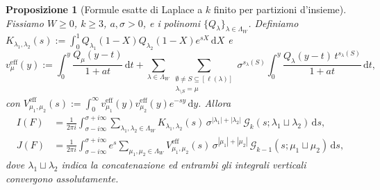 \documentclass[11pt, reqno]{amsart}
\newtheorem{proposition}[lemma]{Proposizione}
\theoremstyle{remark}
\numberwithin{equation}{section}
\newcommand{\cG}{\mathcal{G}}
\newcommand{\dd}{\,\mathrm{d}}
\begin{document}
\begin{proposition}[Formule esatte di Laplace a $k$ finito per partizioni d'insieme]\label{prop:exact-laplace}
Fissiamo $W \ge 0$, $k \ge 3$, $a, \sigma > 0$, e i polinomi $\{Q_\lambda\}_{\lambda \in \Lambda_W}$.
Definiamo $K_{\lambda_1,\lambda_2}(s) := \int_0^1 Q_{\lambda_1}(1-X) Q_{\lambda_2}(1-X) e^{sX}\dd X$ e
\begin{equation}\label{eq:v-eff-def}
v_\mu^{\mathrm{eff}}(y) := \int_0^y \frac{Q_\mu(y-t)}{1+at}\dd t
+ \sum_{\lambda \in \Lambda_W}\sum_{\substack{\emptyset \neq S \subseteq [\ell(\lambda)] \\ \lambda_{\setminus S} = \mu}}
\sigma^{s_\lambda(S)} \int_0^y \frac{Q_\lambda(y-t)\, t^{s_\lambda(S)}}{1+at}\dd t,
\end{equation}
con $V_{\mu_1,\mu_2}^{\mathrm{eff}}(s) := \int_0^\infty v_{\mu_1}^{\mathrm{eff}}(y) v_{\mu_2}^{\mathrm{eff}}(y) e^{-sy}\dd y$.
Allora
\begin{align}
I(F) &= \frac{1}{2\pi i}\int_{\sigma-i\infty}^{\sigma+i\infty}
\sum_{\lambda_1,\lambda_2 \in \Lambda_W} K_{\lambda_1,\lambda_2}(s)\,
\sigma^{|\lambda_1|+|\lambda_2|} \, \cG_k(s; \lambda_1 \sqcup \lambda_2)\dd s,
\label{eq:I-exact-laplace}\\
J(F) &= \frac{1}{2\pi i}\int_{\sigma-i\infty}^{\sigma+i\infty}
e^s \sum_{\mu_1,\mu_2 \in \Lambda_W} V_{\mu_1,\mu_2}^{\mathrm{eff}}(s)\,
\sigma^{|\mu_1|+|\mu_2|} \, \cG_{k-1}(s; \mu_1 \sqcup \mu_2)\dd s,
\label{eq:J-exact-laplace}
\end{align}
dove $\lambda_1 \sqcup \lambda_2$ indica la concatenazione ed entrambi gli integrali verticali convergono assolutamente.
\end{proposition}
\end{document}
